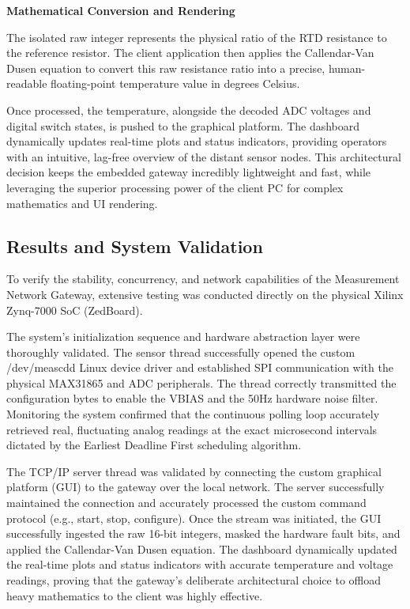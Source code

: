 \textbf{Mathematical Conversion and Rendering}

The isolated raw integer represents the physical ratio of the RTD resistance
to the reference resistor. The client application then applies the
Callendar-Van Dusen equation to convert this raw resistance ratio into a
precise, human-readable floating-point temperature value in degrees Celsius.

Once processed, the temperature, alongside the decoded ADC voltages and
digital switch states, is pushed to the graphical platform. The dashboard
dynamically updates real-time plots and status indicators, providing operators with an intuitive, lag-free overview of the distant sensor nodes. This architectural decision keeps the embedded gateway incredibly lightweight and fast, while leveraging the superior processing power of the client PC for complex mathematics and UI rendering.

\subsection{Results and System Validation}
To verify the stability, concurrency, and network capabilities of the Measurement Network Gateway, extensive testing was conducted directly on the physical Xilinx Zynq-7000 SoC (ZedBoard).

The system's initialization sequence and hardware abstraction layer were thoroughly validated. The sensor thread successfully opened the custom /dev/meascdd Linux device driver and established SPI communication with the physical MAX31865 and ADC peripherals. The thread correctly transmitted the configuration bytes to enable the VBIAS and the 50Hz hardware noise filter. Monitoring the system confirmed that the continuous polling loop accurately retrieved real, fluctuating analog readings at the exact microsecond intervals dictated by the Earliest Deadline First scheduling algorithm.

The TCP/IP server thread was validated by connecting the custom graphical platform (GUI) to the gateway over the local network. The server successfully maintained the connection and accurately processed the custom command protocol (e.g., start, stop, configure). Once the stream was initiated, the GUI successfully ingested the raw 16-bit integers, masked the hardware fault bits, and applied the Callendar-Van Dusen equation. The dashboard dynamically updated the real-time plots and status indicators with accurate temperature and voltage readings, proving that the gateway's deliberate architectural choice to offload heavy mathematics to the client was highly effective.

